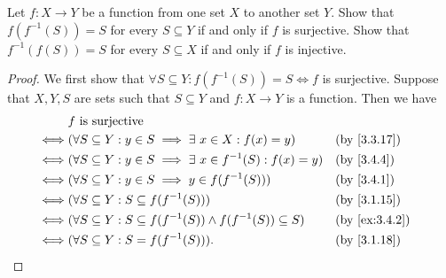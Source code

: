 \begin{ex}\label{ex:3.4.5}
  Let \(f : X \to Y\) be a function from one set \(X\) to another set \(Y\).
  Show that \(f(f^{-1}(S)) = S\) for every \(S \subseteq Y\) if and only if \(f\) is surjective.
  Show that \(f^{-1}(f(S)) = S\) for every \(S \subseteq X\) if and only if \(f\) is injective.
\end{ex}

\begin{proof}
  We first show that \(\forall S \subseteq Y : f(f^{-1}(S)) = S \iff f\) is surjective.
  Suppose that \(X, Y, S\) are sets such that \(S \subseteq Y\) and \(f : X \to Y\) is a function.
  Then we have
  \begin{align*}
         & f \text{ is surjective}                                                                                            \\
    \iff & (\forall S \subseteq Y : y \in S \implies \exists\ x \in X : f(x) = y)            &  & \text{(by \cref{3.3.17})}   \\
    \iff & (\forall S \subseteq Y : y \in S \implies \exists\ x \in f^{-1}(S) : f(x) = y)    &  & \by{3.4.4}                  \\
    \iff & (\forall S \subseteq Y : y \in S \implies y \in f(f^{-1}(S)))                     &  & \by{3.4.1}                  \\
    \iff & (\forall S \subseteq Y : S \subseteq f(f^{-1}(S)))                                &  & \text{(by \cref{3.1.15})}   \\
    \iff & (\forall S \subseteq Y : S \subseteq f(f^{-1}(S)) \land f(f^{-1}(S)) \subseteq S) &  & \text{(by \cref{ex:3.4.2})} \\
    \iff & (\forall S \subseteq Y : S = f(f^{-1}(S))).                                       &  & \text{(by \cref{3.1.18})}
  \end{align*}


\end{proof}
